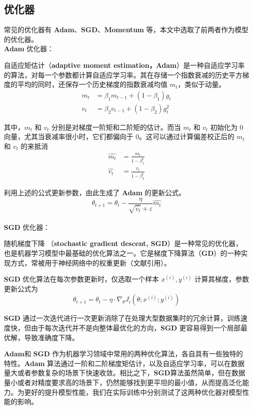     \subsection{优化器}
        \par 常见的优化器有 \textbf{Adam}、\textbf{SGD}、\textbf{Momentum} 等，本文中选取了前两者作为模型的优化器。 \\
        \textbf{Adam} 优化器：
        \par 自适应矩估计（\textbf{adaptive moment estimation，Adam}）\cite{ref11}是一种自适应学习率的算法，对每一个参数都计算自适应学习率。其在存储一个指数衰减的历史平方梯度的平均的同时，还保存一个历史梯度的指数衰减均值 $m_t$，类似于动量。 \begin{align*}m_t &= \beta_1m_{t-1} + (1-\beta_1)g_t \\ v_t &= \beta_2v_{t-1} + (1-\beta_2)g_t^2 \end{align*}
        \par 其中，$m_t$ 和 $v_t$ 分别是对梯度一阶矩和二阶矩的估计。而当 $m_t$ 和 $v_t$ 初始化为 $0$ 向量，尤其当衰减率很小时，它们都偏向于 $0$。这可以通过计算偏差校正后的 $m_t$ 和 $v_t$ 的来抵消\cite{ref12} \begin{align*} \hat{m_t} &= \frac{m_t}{1-\beta_1^t} \\ \hat{v_t} &= \frac{v_t}{1-\beta_2^t}\end{align*}
        \par 利用上述的公式更新参数，由此生成了 \textbf{Adam} 的更新公式。 $$\theta_{t+1} = \theta_t - \frac{\eta}{\sqrt{\hat{v_t}}+\varepsilon}\hat{m_t}$$ \\
        \textbf{SGD} 优化器：
        \par 随机梯度下降 （\textbf{stochastic gradient descent, SGD}）\cite{ref12}是一种常见的优化器，也是机器学习模型中最基础的优化算法之一。它是梯度下降算法（\textbf{GD}）的一种实现方式，常被用于神经网络中的权重更新（文献引用）。
        \par \textbf{SGD} 优化算法在每次参数更新时，仅选取一个样本 $x^{(i)}, y^{(i)}$ 计算其梯度，参数更新公式为 $$\theta_{t+1} = \theta_t - \eta \cdot \nabla_\theta J_i(\theta; x^{(i)}; y^{(i)})$$
        \par \textbf{SGD} 通过一次迭代进行一次更新消除了在处理大型数据集时的冗余计算，训练速度快，但由于每次迭代并不是向整体最优化的方向，\textbf{SGD} 更容易得到一个局部最优解，导致准确度下降。
        \par \textbf{Adam}和 \textbf{SGD} 作为机器学习领域中常用的两种优化算法，各自具有一些独特的特性。\textbf{Adam} 算法通过一阶和二阶梯度矩估计，以及自适应学习率，可以在数据量大或者参数复杂的场景下快速收敛。相比之下，\textbf{SGD}算法虽然简单，但在数据量小或者对精度要求高的场景下，仍然能够找到更平坦的最小值，从而提高泛化能力。为更好的提升模型性能，我们在实际训练中分别测试了这两种优化器对模型性能的影响。

